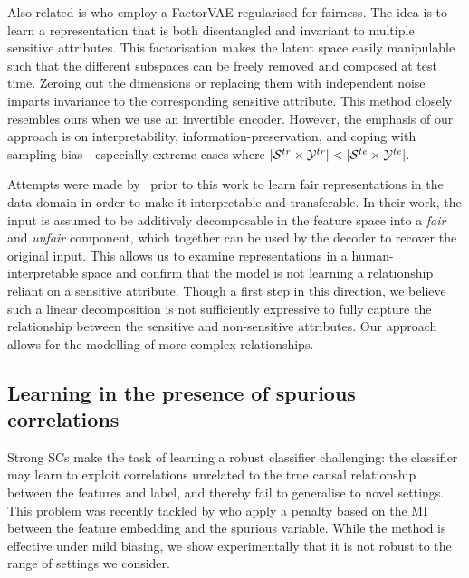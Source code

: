 Also related is \citet{creager2019flexibly} who employ a FactorVAE \citep{kim2018disentangling}
regularised for fairness. 
%
The idea is to learn a representation that is both disentangled and invariant to multiple sensitive
attributes. 
%
This factorisation makes the latent space easily manipulable such that the different subspaces can
be freely removed and composed at test time. Zeroing out the dimensions or replacing them with
independent noise imparts invariance to the corresponding sensitive attribute. 
%
This method closely resembles ours when we use an invertible encoder. 
%
However, the emphasis of our approach is on interpretability, information-preservation, and coping
with sampling bias - especially extreme cases where \( |{\mathcal{S}}^{tr} \times {\mathcal{Y}}^{tr}| < | {\mathcal{S}}^{te}
\times {\mathcal{Y}}^{te} | \).

Attempts were made by~\citet{QuaShaTho19} prior to this work to learn fair representations in the
data domain in order to make it interpretable and transferable. In their work, the input is assumed
to be additively decomposable in the feature space into a \emph{fair} and \emph{unfair} component,
which together can be used by the decoder to recover the original input. This allows us to examine
representations in a human-interpretable space and confirm that the model is not learning a
relationship reliant on a sensitive attribute. Though a first step in this direction, we believe
such a linear decomposition is not sufficiently expressive to fully capture the relationship
between the sensitive and non-sensitive attributes. Our approach allows for the modelling of more
complex relationships.

\subsection{Learning in the presence of spurious correlations}
Strong \aclp{SC} make the task of learning a robust classifier challenging: the classifier may
learn to exploit correlations unrelated to the true causal relationship between the features and
label, and thereby fail to generalise to novel settings. 
%
This problem was recently tackled by \citet{kim2019learning} who apply a penalty based on the
\ac{MI} between the feature embedding and the spurious variable. 
%
While the method is effective under mild biasing, we show experimentally that it is not robust to
the range of settings we consider.

